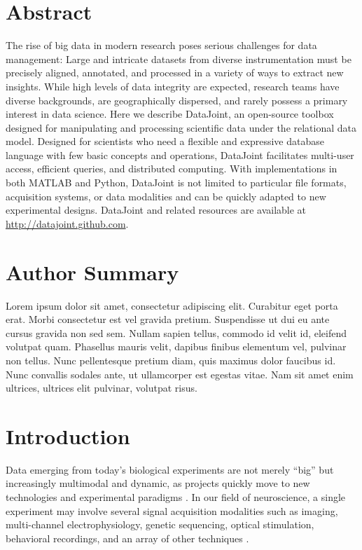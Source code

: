 \documentclass[10pt,letterpaper]{article}
\begin{document}
\section*{Abstract}
The rise of big data in modern research poses serious challenges for data management: Large and intricate datasets from diverse instrumentation must be precisely aligned, annotated, and processed in a variety of ways to extract new insights. 
While high levels of data integrity are expected, research teams have diverse backgrounds, are geographically dispersed, and rarely possess a primary interest in data science. 
Here we describe DataJoint, an open-source toolbox designed for manipulating and processing scientific data under the relational data model. 
Designed for scientists who need a flexible and expressive database language with few basic concepts and operations, DataJoint facilitates multi-user access, efficient queries, and distributed computing. 
With implementations in both MATLAB and Python, DataJoint is not limited to particular file formats, acquisition systems, or data modalities and can be quickly adapted to new experimental designs. 
DataJoint and related resources are available at \url{http://datajoint.github.com}.


\section*{Author Summary}
Lorem ipsum dolor sit amet, consectetur adipiscing elit. Curabitur eget porta erat. Morbi consectetur est vel gravida pretium. Suspendisse ut dui eu ante cursus gravida non sed sem. Nullam sapien tellus, commodo id velit id, eleifend volutpat quam. Phasellus mauris velit, dapibus finibus elementum vel, pulvinar non tellus. Nunc pellentesque pretium diam, quis maximus dolor faucibus id. Nunc convallis sodales ante, ut ullamcorper est egestas vitae. Nam sit amet enim ultrices, ultrices elit pulvinar, volutpat risus.

\linenumbers

\section*{Introduction}
Data emerging from today's biological experiments are not merely ``big'' but increasingly multimodal and dynamic, as projects quickly move to new technologies and experimental paradigms \cite{howe_big_2008, maze_analytical_2014, editorial_focus_2014, anderson_issues_2007, kandel_neuroscience_2013, gray_scientific_2005}.
In our field of neuroscience, a single experiment may involve several signal acquisition modalities such as imaging, multi-channel electrophysiology, genetic sequencing, optical stimulation, behavioral recordings, and an array of other techniques \cite{reimer_pupil_2014,froudarakis_population_2014}.
\end{document}
